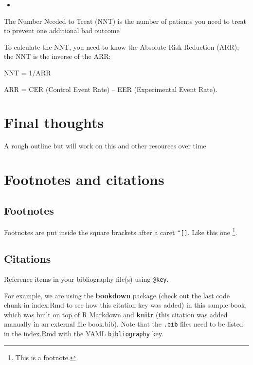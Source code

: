 \documentclass[
]{book}
\providecommand{\tightlist}{%
  \setlength{\itemsep}{0pt}\setlength{\parskip}{0pt}}
\theoremstyle{definition}
\theoremstyle{definition}
\theoremstyle{definition}
\theoremstyle{definition}
\theoremstyle{remark}
\begin{document}
\begin{itemize}
\tightlist
\item
\end{itemize}

The Number Needed to Treat (NNT) is the number of patients you need to treat to prevent one additional bad outcome

To calculate the NNT, you need to know the Absolute Risk Reduction (ARR); the NNT is the inverse of the ARR:

NNT = 1/ARR

ARR = CER (Control Event Rate) -- EER (Experimental Event Rate).

\hypertarget{final-thoughts}{%
\chapter{Final thoughts}\label{final-thoughts}}

A rough outline but will work on this and other resources over time

\hypertarget{footnotes-and-citations}{%
\chapter{Footnotes and citations}\label{footnotes-and-citations}}

\hypertarget{footnotes}{%
\section{Footnotes}\label{footnotes}}

Footnotes are put inside the square brackets after a caret \texttt{\^{}{[}{]}}. Like this one \footnote{This is a footnote.}.

\hypertarget{citations}{%
\section{Citations}\label{citations}}

Reference items in your bibliography file(s) using \texttt{@key}.

For example, we are using the \textbf{bookdown} package \citep{R-bookdown} (check out the last code chunk in index.Rmd to see how this citation key was added) in this sample book, which was built on top of R Markdown and \textbf{knitr} \citep{xie2015} (this citation was added manually in an external file book.bib).
Note that the \texttt{.bib} files need to be listed in the index.Rmd with the YAML \texttt{bibliography} key.
\end{document}
